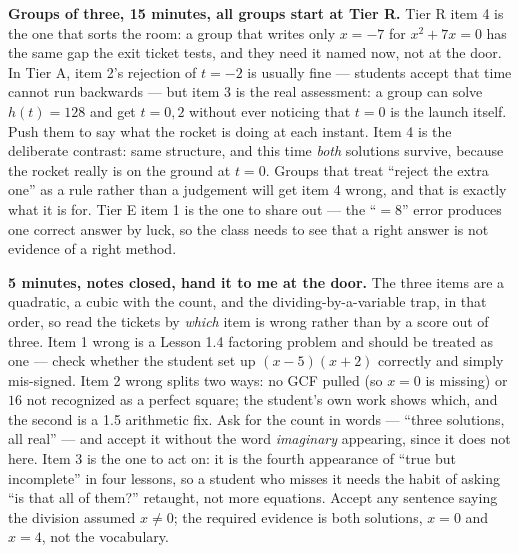 \documentclass[10pt]{article}
\begin{document}
\begin{teachernote}
    \textbf{Groups of three, 15 minutes, all groups start at Tier R.} Tier R item 4 is the one that
    sorts the room: a group that writes only $x=-7$ for $x^2+7x=0$ has the same gap the exit ticket
    tests, and they need it named now, not at the door. In Tier A, item 2's rejection of $t=-2$ is
    usually fine --- students accept that time cannot run backwards --- but item 3 is the real
    assessment: a group can solve $h(t)=128$ and get $t=0,2$ without ever noticing that $t=0$ is the
    launch itself. Push them to say what the rocket is doing at each instant. Item 4 is the
    deliberate contrast: same structure, and this time \emph{both} solutions survive, because the
    rocket really is on the ground at $t=0$. Groups that treat ``reject the extra one'' as a rule
    rather than a judgement will get item 4 wrong, and that is exactly what it is for. Tier E item 1
    is the one to share out --- the ``$=8$'' error produces one correct answer by luck, so the class
    needs to see that a right answer is not evidence of a right method.
\end{teachernote}

\begin{teachernote}
    \textbf{5 minutes, notes closed, hand it to me at the door.} The three items are a quadratic,
    a cubic with the count, and the dividing-by-a-variable trap, in that order, so read the tickets
    by \emph{which} item is wrong rather than by a score out of three. Item 1 wrong is a Lesson 1.4
    factoring problem and should be treated as one --- check whether the student set up
    $(x-5)(x+2)$ correctly and simply mis-signed. Item 2 wrong splits two ways: no GCF pulled (so
    $x=0$ is missing) or $16$ not recognized as a perfect square; the student's own work shows
    which, and the second is a 1.5 arithmetic fix. Ask for the count in words --- ``three solutions,
    all real'' --- and accept it without the word \emph{imaginary} appearing, since it does not here.
    Item 3 is the one to act on: it is the fourth appearance of ``true but incomplete'' in four
    lessons, so a student who misses it needs the habit of asking ``is that all of them?'' retaught,
    not more equations. Accept any sentence saying the division assumed $x \ne 0$; the required
    evidence is both solutions, $x=0$ and $x=4$, not the vocabulary.
\end{teachernote}
\end{document}

